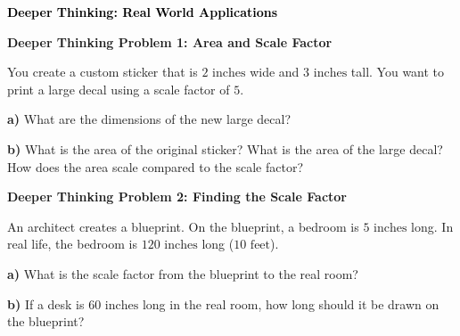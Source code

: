 \documentclass[12pt, letterpaper, fleqn]{article}
\begin{document}
\newpage

\begin{tcolorbox}[colback=customteal!20]
\large\textcolor{black}{\textbf{Deeper Thinking: Real World Applications}}
\end{tcolorbox}

\vspace{3mm}

\begin{tcolorbox}[colback=white!15, colframe=black, boxrule=1.5pt, arc=4mm, left=6mm, right=6mm, top=5mm, bottom=5mm]

\textbf{Deeper Thinking Problem 1: Area and Scale Factor}

\medskip

\noindent
You create a custom sticker that is $2\text{ inches}$ wide and $3\text{ inches}$ tall. You want to print a large decal using a scale factor of $5$.

\vspace{5mm}

\noindent
\textbf{a)} What are the dimensions of the new large decal?

\vspace{2.5cm}

\noindent
\textbf{b)} What is the area of the original sticker? What is the area of the large decal? How does the area scale compared to the scale factor?

\vspace{3cm}

\end{tcolorbox}

\vspace{4mm}

\begin{tcolorbox}[colback=white!15, colframe=black, boxrule=1.5pt, arc=4mm, left=6mm, right=6mm, top=5mm, bottom=5mm]

\textbf{Deeper Thinking Problem 2: Finding the Scale Factor}

\medskip

\noindent
An architect creates a blueprint. On the blueprint, a bedroom is $5\text{ inches}$ long. In real life, the bedroom is $120\text{ inches}$ long ($10\text{ feet}$).

\vspace{5mm}

\noindent
\textbf{a)} What is the scale factor from the blueprint to the real room?

\vspace{2.5cm}

\noindent
\textbf{b)} If a desk is $60\text{ inches}$ long in the real room, how long should it be drawn on the blueprint?

\vspace{3cm}

\end{tcolorbox}
\end{document}
